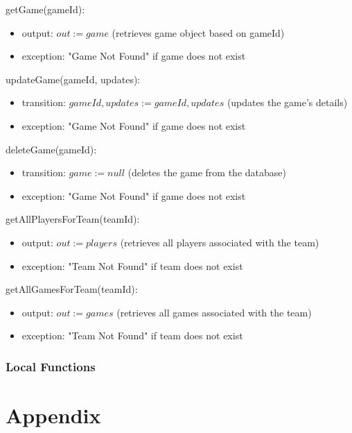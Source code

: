 \documentclass[12pt, titlepage]{article}
\begin{document}
\noindent getGame(gameId):
\begin{itemize}
\item output: $out := game$ (retrieves game object based on gameId)
\item exception: "Game Not Found" if game does not exist
\end{itemize}

\noindent updateGame(gameId, updates):
\begin{itemize}
\item transition: $gameId, updates := gameId, updates$ (updates the game's details)
\item exception: "Game Not Found" if game does not exist
\end{itemize}

\noindent deleteGame(gameId):
\begin{itemize}
\item transition: $game := null$ (deletes the game from the database)
\item exception: "Game Not Found" if game does not exist
\end{itemize}

\noindent getAllPlayersForTeam(teamId):
\begin{itemize}
\item output: $out := players$ (retrieves all players associated with the team)
\item exception: "Team Not Found" if team does not exist
\end{itemize}

\noindent getAllGamesForTeam(teamId):
\begin{itemize}
\item output: $out := games$ (retrieves all games associated with the team)
\item exception: "Team Not Found" if team does not exist
\end{itemize}

\subsubsection{Local Functions}

\newpage

\section{Appendix} \label{Appendix}


\newpage{}
\end{document}
